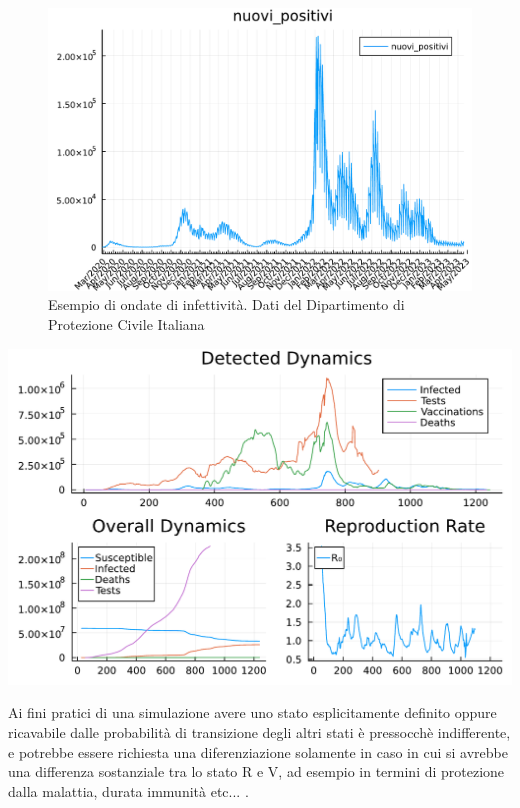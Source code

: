 \begin{figure}[h]
    \begin{center}
        \includegraphics[scale=0.6]{img/nuovi_positivi_2023-04-21.pdf}
        \caption{Esempio di ondate di infettività. Dati del Dipartimento di Protezione Civile Italiana}
        \label{fig:DPC_new_positive}
    \end{center}
\end{figure}

\begin{minipage}{\linewidth}
	\centering
	\includegraphics[width=\textwidth]{img/cumulative_plot_2023-06-11.pdf}
	\label{fig:voc}
\end{minipage}

Ai fini pratici di una simulazione avere uno stato esplicitamente definito
oppure ricavabile dalle probabilità di transizione degli altri stati 
è pressocchè indifferente, e potrebbe essere richiesta una diferenziazione
solamente in caso in cui si avrebbe una differenza sostanziale tra lo stato
R e V, ad esempio in termini di protezione dalla malattia, durata immunità etc... .

